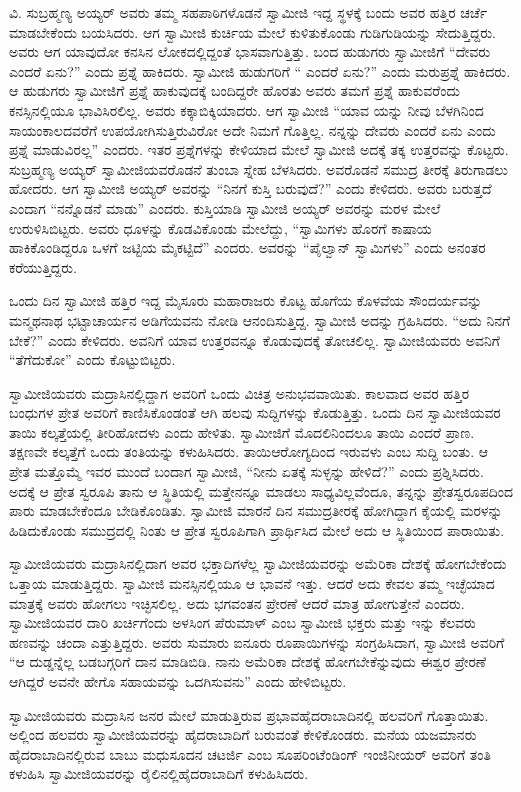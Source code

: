  ವಿ. ಸುಬ್ರಹ್ಮಣ್ಯ ಅಯ್ಯರ್ ಅವರು ತಮ್ಮ ಸಹಪಾಠಿಗಳೊಡನೆ ಸ್ವಾಮೀಜಿ ಇದ್ದ ಸ್ಥಳಕ್ಕೆ ಬಂದು ಅವರ ಹತ್ತಿರ ಚರ್ಚೆ ಮಾಡಬೇಕೆಂದು ಬಯಸಿದರು. ಆಗ ಸ್ವಾಮೀಜಿ ಕುರ್ಚಿಯ ಮೇಲೆ ಕುಳಿತುಕೊಂಡು ಗುಡಿಗುಡಿಯನ್ನು ಸೇದುತ್ತಿದ್ದರು. ಅವರು ಆಗ ಯಾವುದೋ ಕನಸಿನ ಲೋಕದಲ್ಲಿದ್ದಂತೆ ಭಾಸವಾಗುತ್ತಿತ್ತು. ಬಂದ ಹುಡುಗರು ಸ್ವಾಮೀಜಿಗೆ “ದೇವರು ಎಂದರೆ ಏನು?” ಎಂದು ಪ್ರಶ್ನೆ ಹಾಕಿದರು. ಸ್ವಾಮೀಜಿ ಹುಡುಗರಿಗೆ “ ಎಂದರೆ ಏನು?” ಎಂದು ಮರುಪ್ರಶ್ನೆ ಹಾಕಿದರು. ಆ ಹುಡುಗರು ಸ್ವಾಮೀಜಿಗೆ ಪ್ರಶ್ನೆ ಹಾಕುವುದಕ್ಕೆ ಬಂದಿದ್ದರೇ ಹೊರತು ಅವರು ತಮಗೆ ಪ್ರಶ್ನೆ ಹಾಕುವರೆಂದು ಕನಸ್ಸಿನಲ್ಲಿಯೂ ಭಾವಿಸಿರಲಿಲ್ಲ. ಅವರು ಕಕ್ಕಾಬಿಕ್ಕಿಯಾದರು. ಆಗ ಸ್ವಾಮೀಜಿ “ಯಾವ ಯನ್ನು ನೀವು ಬೆಳಗಿನಿಂದ ಸಾಯಂಕಾಲದವರೆಗೆ ಉಪಯೋಗಿಸುತ್ತಿರುವಿರೋ ಅದೇ ನಿಮಗೆ ಗೊತ್ತಿಲ್ಲ. ನನ್ನನ್ನು ದೇವರು ಎಂದರೆ ಏನು ಎಂದು ಪ್ರಶ್ನೆ ಮಾಡುವಿರಲ್ಲ” ಎಂದರು. ಇತರ ಪ್ರಶ್ನೆಗಳನ್ನು ಕೇಳಿಯಾದ ಮೇಲೆ ಸ್ವಾಮೀಜಿ ಅದಕ್ಕೆ ತಕ್ಕ ಉತ್ತರವನ್ನು ಕೊಟ್ಟರು. ಸುಬ್ರಹ್ಮಣ್ಯ ಅಯ್ಯರ್ ಸ್ವಾಮೀಜಿಯವರೊಡನೆ ತುಂಬಾ ಸ್ನೇಹ ಬೆಳಸಿದರು. ಅವರೊಡನೆ ಸಮುದ್ರ ತೀರಕ್ಕೆ ತಿರುಗಾಡಲು ಹೋದರು. ಆಗ ಸ್ವಾಮೀಜಿ ಅಯ್ಯರ್ ಅವರನ್ನು “ನಿನಗೆ ಕುಸ್ತಿ ಬರುವುದೆ?” ಎಂದು ಕೇಳಿದರು. ಅವರು ಬರುತ್ತದೆ ಎಂದಾಗ “ನನ್ನೊಡನೆ ಮಾಡು” ಎಂದರು. ಕುಸ್ತಿಯಾಡಿ ಸ್ವಾಮೀಜಿ ಅಯ್ಯರ್ ಅವರನ್ನು ಮರಳ ಮೇಲೆ ಉರುಳಿಸಿಬಿಟ್ಟರು. ಅವರು ಧೂಳನ್ನು ಕೊಡವಿಕೊಂಡು ಮೇಲೆದ್ದು, “ಸ್ವಾಮಿಗಳು ಹೊರಗೆ ಕಾಷಾಯ ಹಾಕಿಕೊಂಡಿದ್ದರೂ ಒಳಗೆ ಜಟ್ಟಿಯ ಮೈಕಟ್ಟಿದೆ” ಎಂದರು. ಅವರನ್ನು “ಪೈಲ್ವಾನ್ ಸ್ವಾಮಿಗಳು” ಎಂದು ಅನಂತರ ಕರೆಯುತ್ತಿದ್ದರು.

 ಒಂದು ದಿನ ಸ್ವಾಮೀಜಿ ಹತ್ತಿರ ಇದ್ದ ಮೈಸೂರು ಮಹಾರಾಜರು ಕೊಟ್ಟ ಹೊಗೆಯ ಕೊಳವೆಯ ಸೌಂದರ್ಯವನ್ನು ಮನ್ಮಥನಾಥ ಭಟ್ಟಾಚಾರ್ಯನ ಅಡಿಗೆಯವನು ನೋಡಿ ಆನಂದಿಸುತ್ತಿದ್ದ. ಸ್ವಾಮೀಜಿ ಅದನ್ನು ಗ್ರಹಿಸಿದರು. “ಅದು ನಿನಗೆ ಬೇಕೆ?” ಎಂದು ಕೇಳಿದರು. ಅವನಿಗೆ ಯಾವ ಉತ್ತರವನ್ನೂ ಕೊಡುವುದಕ್ಕೆ ತೋಚಲಿಲ್ಲ. ಸ್ವಾಮೀಜಿಯವರು ಅವನಿಗೆ “ತೆಗೆದುಕೋ” ಎಂದು ಕೊಟ್ಟುಬಿಟ್ಟರು. 

 ಸ್ವಾಮೀಜಿಯವರು ಮದ್ರಾಸಿನಲ್ಲಿದ್ದಾಗ ಅವರಿಗೆ ಒಂದು ವಿಚಿತ್ರ ಅನುಭವವಾಯಿತು. ಕಾಲವಾದ ಅವರ ಹತ್ತಿರ ಬಂಧುಗಳ ಪ್ರೇತ ಅವರಿಗೆ ಕಾಣಿಸಿಕೊಂಡಂತೆ ಆಗಿ ಹಲವು ಸುದ್ದಿಗಳನ್ನು ಕೊಡುತ್ತಿತ್ತು. ಒಂದು ದಿನ ಸ್ವಾಮೀಜಿಯವರ ತಾಯಿ ಕಲ್ಕತ್ತೆಯಲ್ಲಿ ತೀರಿಹೋದಳು ಎಂದು ಹೇಳಿತು. ಸ್ವಾಮೀಜಿಗೆ ಮೊದಲಿನಿಂದಲೂ ತಾಯಿ ಎಂದರೆ ಪ್ರಾಣ. ತಕ್ಷಣವೇ ಕಲ್ಕತ್ತೆಗೆ ಒಂದು ತಂತಿಯನ್ನು ಕಳುಹಿಸಿದರು. ತಾಯಿ\break ಆರೋಗ್ಯದಿಂದ ಇರುವಳು ಎಂಬ ಸುದ್ದಿ ಬಂತು. ಆ ಪ್ರೇತ ಮತ್ತೊಮ್ಮೆ ಇವರ ಮುಂದೆ ಬಂದಾಗ ಸ್ವಾಮೀಜಿ, “ನೀನು ಏತಕ್ಕೆ ಸುಳ್ಳನ್ನು ಹೇಳಿದೆ?” ಎಂದು ಪ್ರಶ್ನಿಸಿದರು. ಅದಕ್ಕೆ ಆ ಪ್ರೇತ ಸ್ವರೂಪಿ ತಾನು ಆ ಸ್ಥಿತಿಯಲ್ಲಿ ಮತ್ತೇನನ್ನೂ ಮಾಡಲು ಸಾಧ್ಯವಿಲ್ಲವೆಂದೂ, ತನ್ನನ್ನು ಪ್ರೇತಸ್ವರೂಪದಿಂದ ಪಾರು ಮಾಡಬೇಕೆಂದೂ ಬೇಡಿಕೊಂಡಿತು. ಸ್ವಾಮೀಜಿ ಮಾರನೆ ದಿನ ಸಮುದ್ರತೀರಕ್ಕೆ ಹೋಗಿದ್ದಾಗ ಕೈಯಲ್ಲಿ ಮರಳನ್ನು ಹಿಡಿದುಕೊಂಡು ಸಮುದ್ರದಲ್ಲಿ ನಿಂತು ಆ ಪ್ರೇತ ಸ್ವರೂಪಿಗಾಗಿ ಪ್ರಾರ್ಥಿಸಿದ ಮೇಲೆ ಅದು ಆ ಸ್ಥಿತಿಯಿಂದ ಪಾರಾಯಿತು. 

 ಸ್ವಾಮೀಜಿಯವರು ಮದ್ರಾಸಿನಲ್ಲಿದಾಗ ಅವರ ಭಕ್ತಾದಿಗಳೆಲ್ಲ ಸ್ವಾಮೀಜಿಯವರನ್ನು ಅಮೆರಿಕಾ ದೇಶಕ್ಕೆ ಹೋಗಬೇಕೆಂದು ಒತ್ತಾಯ ಮಾಡುತ್ತಿದ್ದರು. ಸ್ವಾಮೀಜಿ ಮನಸ್ಸಿನಲ್ಲಿಯೂ ಆ ಭಾವನೆ ಇತ್ತು. ಆದರೆ ಅದು ಕೇವಲ ತಮ್ಮ ಇಚ್ಛೆಯಾದ ಮಾತ್ರಕ್ಕೆ ಅವರು ಹೋಗಲು ಇಚ್ಛಿಸಲಿಲ್ಲ. ಅದು ಭಗವಂತನ ಪ್ರೇರಣೆ ಆದರೆ ಮಾತ್ರ ಹೋಗುತ್ತೇನೆ ಎಂದರು. ಸ್ವಾಮೀಜಿಯವರ ದಾರಿ ಖರ್ಚಿಗೆಂದು ಅಳಸಿಂಗ ಪೆರುಮಾಳ್ ಎಂಬ ಸ್ವಾಮೀಜಿ ಭಕ್ತರು ಮತ್ತು ಇನ್ನು ಕೆಲವರು ಹಣವನ್ನು ಚಂದಾ ಎತ್ತುತ್ತಿದ್ದರು. ಅವರು ಸುಮಾರು ಐನೂರು ರೂಪಾಯಿಗಳನ್ನು ಸಂಗ್ರಹಿಸಿದಾಗ, ಸ್ವಾಮೀಜಿ ಅವರಿಗೆ “ಆ ದುಡ್ಡನ್ನೆಲ್ಲ ಬಡಬಗ್ಗರಿಗೆ ದಾನ ಮಾಡಿಬಿಡಿ. ನಾನು ಅಮೆರಿಕಾ ದೇಶಕ್ಕೆ ಹೋಗಬೇಕೆನ್ನುವುದು ಈಶ್ವರ ಪ್ರೇರಣೆ ಆಗಿದ್ದರೆ ಅವನೇ ಹೇಗೊ ಸಹಾಯವನ್ನು ಒದಗಿಸುವನು” ಎಂದು ಹೇಳಿಬಿಟ್ಟರು. 

 ಸ್ವಾಮೀಜಿಯವರು ಮದ್ರಾಸಿನ ಜನರ ಮೇಲೆ ಮಾಡುತ್ತಿರುವ ಪ್ರಭಾವ\break ಹೈದರಾಬಾದಿನಲ್ಲಿ ಹಲವರಿಗೆ ಗೊತ್ತಾಯಿತು. ಅಲ್ಲಿಂದ ಹಲವರು ಸ್ವಾಮೀಜಿಯವರನ್ನು ಹೈದರಾಬಾದಿಗೆ ಬರುವಂತೆ ಕೇಳಿಕೊಂಡರು. ಮನೆಯ ಯಜಮಾನರು ಹೈದರಾಬಾದಿನಲ್ಲಿರುವ ಬಾಬು ಮಧುಸೂದನ ಚಟರ್ಜಿ ಎಂಬ ಸೂಪರಿಂಟೆಂಡಿಂಗ್ ಇಂಜಿನೀಯರ್ ಅವರಿಗೆ ತಂತಿ ಕಳುಹಿಸಿ ಸ್ವಾಮೀಜಿಯವರನ್ನು ರೈಲಿನಲ್ಲಿ\break ಹೈದರಾಬಾದಿಗೆ ಕಳುಹಿಸಿದರು. 

